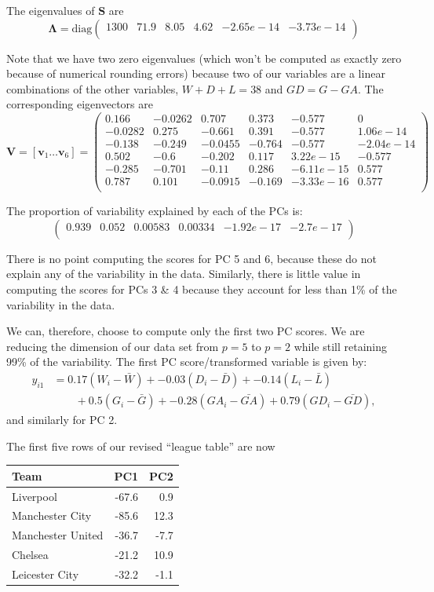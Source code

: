 \documentclass[]{book}
\theoremstyle{definition}
\theoremstyle{definition}
\theoremstyle{definition}
\theoremstyle{remark}
\begin{document}
The eigenvalues of \(\boldsymbol S\) are
\[\boldsymbol \Lambda= \text{diag}\begin{pmatrix}1300&71.9&8.05&4.62&-2.65e-14&-3.73e-14 \\\end{pmatrix}\]

Note that we have two zero eigenvalues (which won't be computed as exactly zero because of numerical rounding errors) because two of our variables are a linear combinations of the other variables, \(W+D+L = 38\) and \(GD=G-GA\). The corresponding eigenvectors are
\[\boldsymbol V= [\boldsymbol v_1 \ldots \boldsymbol v_6] =\begin{pmatrix}0.166&-0.0262&0.707&0.373&-0.577&0 \\-0.0282&0.275&-0.661&0.391&-0.577&1.06e-14 \\-0.138&-0.249&-0.0455&-0.764&-0.577&-2.04e-14 \\0.502&-0.6&-0.202&0.117&3.22e-15&-0.577 \\-0.285&-0.701&-0.11&0.286&-6.11e-15&0.577 \\0.787&0.101&-0.0915&-0.169&-3.33e-16&0.577 \\\end{pmatrix}\]

The proportion of variability explained by each of the PCs is:
\[
\begin{pmatrix}0.939&0.052&0.00583&0.00334&-1.92e-17&-2.7e-17 \\\end{pmatrix}
\]

There is no point computing the scores for PC 5 and 6, because these do not explain any of the variability in the data. Similarly, there is little value in computing the scores for PCs 3 \& 4 because they account for less than 1\% of the variability in the data.

We can, therefore, choose to compute only the first two PC scores. We are reducing the dimension of our data set from \(p=5\) to \(p=2\) while still retaining 99\% of the variability. The first PC score/transformed variable is given by:
\begin{align*}
y_{i1} &= 0.17(W_i-\bar{W}) +-0.03(D_i-\bar{D}) +-0.14(L_i-\bar{L})\\
& \qquad +0.5(G_i-\bar{G}) +-0.28(GA_i-\bar{GA})+0.79(GD_i-\bar{GD}),
\end{align*}
and similarly for PC 2.

The first five rows of our revised ``league table'' are now

\begin{table}[H]
\centering
\begin{tabular}{lrr}
\toprule
Team & PC1 & PC2\\
\midrule
Liverpool & -67.6 & 0.9\\
Manchester City & -85.6 & 12.3\\
Manchester United & -36.7 & -7.7\\
Chelsea & -21.2 & 10.9\\
Leicester City & -32.2 & -1.1\\
\bottomrule
\end{tabular}
\end{table}
\end{document}
